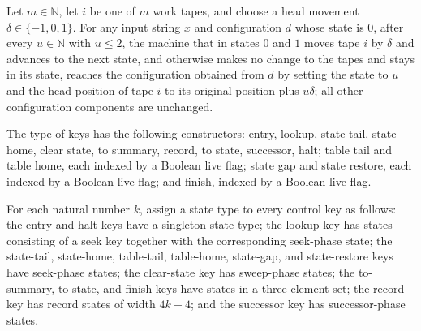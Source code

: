 \begin{lemma}
\label{Turing.StepBlock.twoMoveTM_run}
\leanok
{}
Let $m\in\mathbb{N}$, let $i$ be one of $m$ work tapes, and choose a head movement
$\delta\in\{-1,0,1\}$. For any input string $x$ and configuration $d$ whose state is
$0$, after every $u\in\mathbb{N}$ with $u\le 2$, the machine that in states $0$ and $1$
moves tape $i$ by $\delta$ and advances to the next state, and otherwise makes no change
to the tapes and stays in its state, reaches the configuration obtained from $d$ by
setting the state to $u$ and the head position of tape $i$ to its original position plus
$u\delta$; all other configuration components are unchanged.
\end{lemma}

\begin{definition}
\label{Turing.StepBlock.Key}
\leanok
The type of keys has the following constructors: entry, lookup, state tail, state home,
clear state, to summary, record, to state, successor, halt; table tail and table home,
each indexed by a Boolean live flag; state gap and state restore, each indexed by a
Boolean live flag; and finish, indexed by a Boolean live flag.
\end{definition}

\begin{definition}
\label{Turing.StepBlock.Ph}
\leanok
{}
For each natural number $k$, assign a state type to every control key as follows: the
entry and halt keys have a singleton state type; the lookup key has states consisting of
a seek key together with the corresponding seek-phase state; the state-tail, state-home,
table-tail, table-home, state-gap, and state-restore keys have seek-phase states; the
clear-state key has sweep-phase states; the to-summary, to-state, and finish keys have
states in a three-element set; the record key has record states of width $4k+4$; and the
successor key has successor-phase states.
\end{definition}

